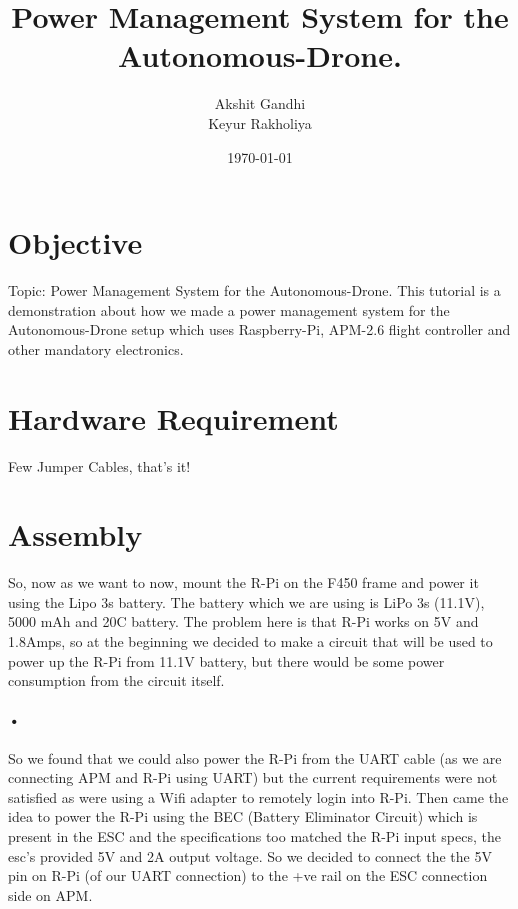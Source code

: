 \documentclass[11pt,a4paper]{article}
\title{Power Management System for the Autonomous-Drone.}
\author{Akshit Gandhi \\ Keyur Rakholiya}
\date{\today}
\begin{document}
	\maketitle
	\newpage
	\tableofcontents
	\newpage
	\section{Objective}
	Topic: Power Management System for the Autonomous-Drone.
		This tutorial is a demonstration about how we made a power management system for the Autonomous-Drone setup which uses Raspberry-Pi, APM-2.6 flight controller and other mandatory electronics.
	\section{Hardware Requirement}
	 Few Jumper Cables, that's it!
	\section{Assembly}
	 So, now as we want to now, mount the R-Pi on the F450 frame and power it using the Lipo 3s battery. The battery which we are using is LiPo 3s (11.1V), 5000 mAh and 20C battery. The problem here is that R-Pi works on 5V and 1.8Amps, so at the beginning we decided to make a circuit that will be used to power up the R-Pi from 11.1V battery, but there would be some power consumption from the circuit itself.\paragraph{•} So we found that we could also power the R-Pi from the UART cable (as we are connecting APM and R-Pi using UART) but the current requirements were not satisfied as were using a Wifi adapter to remotely login into R-Pi. Then came the idea to power the R-Pi using the BEC (Battery Eliminator Circuit) which is present in the ESC and the specifications too matched the R-Pi input specs, the esc's provided 5V and 2A output voltage. So we decided to connect the the 5V pin on R-Pi (of our UART connection) to the +ve rail on the ESC connection side on APM.
\end{document}

